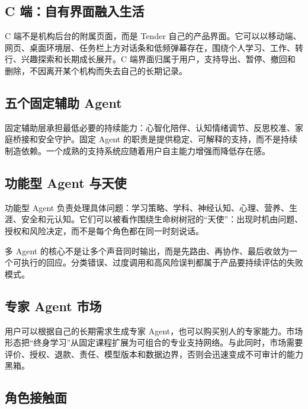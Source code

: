 \documentclass[UTF8,a4paper,11pt]{ctexart}
\begin{document}
\subsection{C 端：自有界面融入生活}

C 端不是机构后台的附属页面，而是 Tender 自己的产品界面。它可以以移动端、网页、桌面环境层、任务栏上方对话条和低频弹幕存在，围绕个人学习、工作、转行、兴趣探索和长期成长展开。C 端界面归属于用户，支持导出、暂停、撤回和删除，不因离开某个机构而失去自己的长期记录。

\subsection{五个固定辅助 Agent}

固定辅助层承担最低必要的持续能力：心智化陪伴、认知情绪调节、反思校准、家庭桥接和安全守护。固定 Agent 的职责是提供稳定、可解释的支持，而不是持续制造依赖。一个成熟的支持系统应随着用户自主能力增强而降低存在感。

\subsection{功能型 Agent 与天使}

功能型 Agent 负责处理具体问题：学习策略、学科、神经认知、心理、营养、生涯、安全和元认知。它们可以被看作围绕生命树树冠的“天使”：出现时机由问题、授权和风险决定，而不是每个角色都在同一时刻说话。

多 Agent 的核心不是让多个声音同时输出，而是先路由、再协作、最后收敛为一个可执行的回应。分类错误、过度调用和高风险误判都属于产品要持续评估的失败模式。

\subsection{专家 Agent 市场}

用户可以根据自己的长期需求生成专家 Agent，也可以购买别人的专家能力。市场形态把“终身学习”从固定课程扩展为可组合的专业支持网络。与此同时，市场需要评价、授权、退款、责任、模型版本和数据边界，否则会迅速变成不可审计的能力黑箱。

\subsection{角色接触面}
\end{document}
